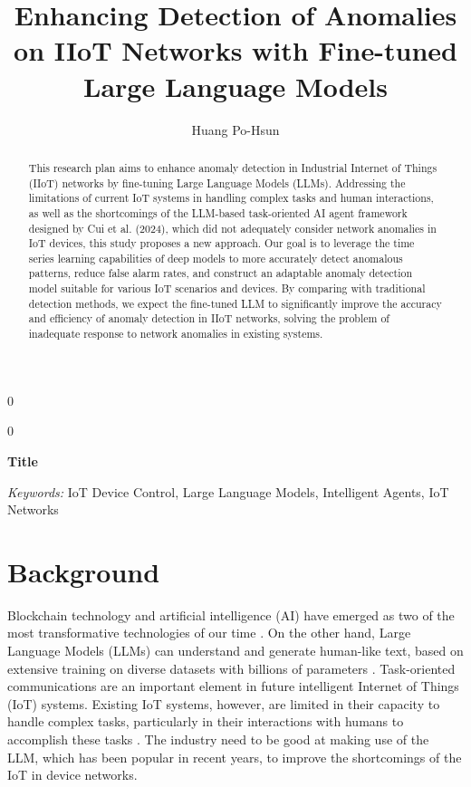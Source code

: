 \documentclass[12pt]{article}
\newcommand{\blind}{0}
\begin{document}
\def\spacingset#1{\renewcommand{\baselinestretch}%
{#1}\small\normalsize} \spacingset{1}


\blind
{
  \title{\bf Enhancing Detection of Anomalies on IIoT Networks with Fine-tuned Large Language Models}
  \author{Huang Po-Hsun}
  \maketitle
} \fi

\blind
{
  \bigskip
  \bigskip
  \bigskip
  \begin{center}
    {\LARGE\bf Title}
  \end{center}
  \medskip
} \fi

\bigskip
\begin{abstract}

  This research plan aims to enhance anomaly detection in Industrial Internet of Things (IIoT) networks by fine-tuning Large Language Models (LLMs). Addressing the limitations of current IoT systems in handling complex tasks and human interactions, as well as the shortcomings of the LLM-based task-oriented AI agent framework designed by Cui et al. (2024), which did not adequately consider network anomalies in IoT devices, this study proposes a new approach. Our goal is to leverage the time series learning capabilities of deep models to more accurately detect anomalous patterns, reduce false alarm rates, and construct an adaptable anomaly detection model suitable for various IoT scenarios and devices. By comparing with traditional detection methods, we expect the fine-tuned LLM to significantly improve the accuracy and efficiency of anomaly detection in IIoT networks, solving the problem of inadequate response to network anomalies in existing systems.

\end{abstract}

\noindent
{\it Keywords:}  IoT Device Control, Large Language Models, Intelligent Agents, IoT Networks

\spacingset{1.45}
\section{Background}
\label{sec:background}

  Blockchain technology and artificial intelligence (AI) have
emerged as two of the most transformative technologies of our
time \citep{zuo2024federated}.
On the other hand,
Large Language Models (LLMs) can understand and generate
human-like text, based on extensive training on diverse datasets
with billions of parameters \citep{kalita2024large}.
Task-oriented communications are an important
element in future intelligent Internet of Things (IoT) systems. Existing IoT systems,
however, are limited in their capacity to handle complex tasks,
particularly in their interactions with humans to accomplish these
tasks \citep{cui2024llmind}. 
The industry need to be good at making use of the LLM,
which has been popular in recent years, to improve
the shortcomings of the IoT in device networks.
\end{document}
